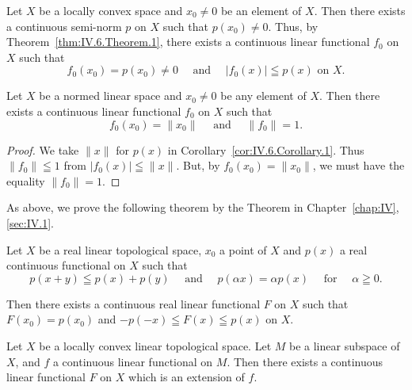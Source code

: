 \begin{corollary}\label{cor:IV.6.Corollary.1} Let $X$ be a locally convex space and $x_{0} \neq 0$ be an element of $X$. Then there exists a continuous semi-norm $p$ on $X$ such that $p(x_{0}) \neq 0$. Thus, by Theorem~\ref{thm:IV.6.Theorem.1}, there exists a continuous linear functional $f_{0}$ on $X$ such that 
\[
f _{0} (x _{0}) = p (x _{0}) \neq 0 \quad \text{ and } \quad | f _{0} (x) | \leqq p (x) \text{ on } X.
\]
\end{corollary}

\begin{corollary}\label{cor:IV.6.Corollary.2} Let $X$ be a normed linear space and $x_{0} \neq 0$ be any element of $X$. Then there exists a continuous linear functional $f_{0}$ on $X$ such that 
\[
f _{0} (x _{0}) = \| x _{0} \| \quad \text{ and } \quad \| f _{0} \| = 1.
\]
\end{corollary}

\begin{proof}
 We take $\|x\|$ for $p(x)$ in Corollary~\ref{cor:IV.6.Corollary.1}. Thus $\|f_0\| \leqq 1$ from $|f_0(x)| \leqq \|x\|$. But, by $f_0(x_0) = \|x_0\|$, we must have the equality $\|f_0\| = 1$. 
\end{proof}

\begin{remarku} As above, we prove the following theorem by the Theorem in Chapter~\ref{chap:IV}, \ref{sec:IV.1}. 
\end{remarku}

\begin{theoremn}\label{thm:IV.6.Theorem.1prime} Let $X$ be a real linear topological space, $x_0$ a point of $X$ and $p(x)$ a real continuous functional on $X$ such that 
\[
p (x + y) \leqq p (x) + p (y) \quad \text{ and } \quad p (\alpha x) = \alpha p (x) \quad \text{ for } \quad \alpha \geqq 0.
\]

Then there exists a continuous real linear functional $F$ on $X$ such that $F(x_0) = p(x_0)$ and $-p(-x) \leqq F(x) \leqq p(x)$ on $X$.
\end{theoremn}

\begin{theorem}\label{thm:IV.6.Theorem.2} Let $X$ be a locally convex linear topological space. Let $M$ be a linear subspace of $X$, and $f$ a continuous linear functional on $M$. Then there exists a continuous linear functional $F$ on $X$ which is an extension of $f$. 
\end{theorem}

